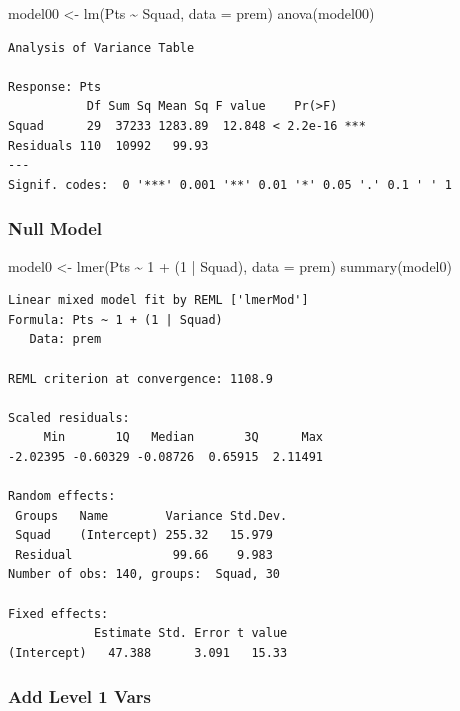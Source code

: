 \documentclass[
  letterpaper,
  DIV=11,
  numbers=noendperiod]{scrartcl}
\newenvironment{Shaded}{\begin{snugshade}}{\end{snugshade}}
\newcommand{\AttributeTok}[1]{\textcolor[rgb]{0.40,0.45,0.13}{#1}}
\newcommand{\DecValTok}[1]{\textcolor[rgb]{0.68,0.00,0.00}{#1}}
\newcommand{\FunctionTok}[1]{\textcolor[rgb]{0.28,0.35,0.67}{#1}}
\newcommand{\NormalTok}[1]{\textcolor[rgb]{0.00,0.23,0.31}{#1}}
\newcommand{\OtherTok}[1]{\textcolor[rgb]{0.00,0.23,0.31}{#1}}
\newcommand{\SpecialCharTok}[1]{\textcolor[rgb]{0.37,0.37,0.37}{#1}}
\begin{document}
\begin{Shaded}
\begin{Highlighting}[]
\NormalTok{model00 }\OtherTok{\textless{}{-}} \FunctionTok{lm}\NormalTok{(Pts }\SpecialCharTok{\textasciitilde{}}\NormalTok{ Squad, }\AttributeTok{data =}\NormalTok{ prem)}
\FunctionTok{anova}\NormalTok{(model00)}
\end{Highlighting}
\end{Shaded}

\begin{verbatim}
Analysis of Variance Table

Response: Pts
           Df Sum Sq Mean Sq F value    Pr(>F)    
Squad      29  37233 1283.89  12.848 < 2.2e-16 ***
Residuals 110  10992   99.93                      
---
Signif. codes:  0 '***' 0.001 '**' 0.01 '*' 0.05 '.' 0.1 ' ' 1
\end{verbatim}

\subsubsection{Null Model}\label{null-model}

\begin{Shaded}
\begin{Highlighting}[]
\NormalTok{model0 }\OtherTok{\textless{}{-}} \FunctionTok{lmer}\NormalTok{(Pts }\SpecialCharTok{\textasciitilde{}} \DecValTok{1} \SpecialCharTok{+}\NormalTok{ (}\DecValTok{1} \SpecialCharTok{|}\NormalTok{ Squad), }\AttributeTok{data =}\NormalTok{ prem)}
\FunctionTok{summary}\NormalTok{(model0)}
\end{Highlighting}
\end{Shaded}

\begin{verbatim}
Linear mixed model fit by REML ['lmerMod']
Formula: Pts ~ 1 + (1 | Squad)
   Data: prem

REML criterion at convergence: 1108.9

Scaled residuals: 
     Min       1Q   Median       3Q      Max 
-2.02395 -0.60329 -0.08726  0.65915  2.11491 

Random effects:
 Groups   Name        Variance Std.Dev.
 Squad    (Intercept) 255.32   15.979  
 Residual              99.66    9.983  
Number of obs: 140, groups:  Squad, 30

Fixed effects:
            Estimate Std. Error t value
(Intercept)   47.388      3.091   15.33
\end{verbatim}

\subsubsection{Add Level 1 Vars}\label{add-level-1-vars}
\end{document}
